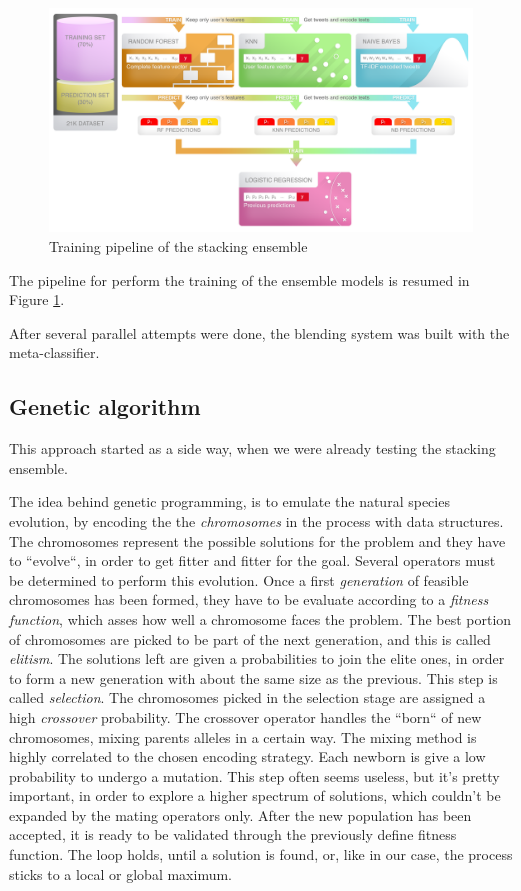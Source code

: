 \begin{figure}[htp!]
	\centering
	\includegraphics[width=\columnwidth]{chapter5/figure/stacking_train.png}
	\caption{Training pipeline of the stacking ensemble}
	\label{fig:stacking_pipeline}
\end{figure}
The pipeline for perform the training of the ensemble models is resumed in Figure \ref{fig:stacking_pipeline}.

After several parallel attempts were done, the blending system was built with the meta-classifier.

\subsection{Genetic algorithm}
This approach started as a side way, when we were already testing the stacking ensemble.

The idea behind genetic programming, is to emulate the natural species evolution, by encoding the the \textit{chromosomes} in the process with data structures.
The chromosomes represent the possible solutions for the problem and they have to ``evolve``, in order to get fitter and fitter for the goal.
Several operators must be determined to perform this evolution.
Once a first \textit{generation} of feasible chromosomes has been formed, they have to be evaluate according to a \textit{fitness function}, which asses how well a chromosome faces the problem.
The best portion of chromosomes are picked to be part of the next generation, and this is called \textit{elitism}. The solutions left are given a probabilities to join the elite ones, in order to form a new generation with about the same size as the previous. This step is called \textit{selection}.
The chromosomes picked in the selection stage are assigned a high \textit{crossover} probability.
The crossover operator handles the ``born`` of new chromosomes, mixing parents alleles in a certain way. The mixing method is highly correlated to the chosen encoding strategy.
Each newborn is give a low probability to undergo a mutation. This step often seems useless, but it's pretty important, in order to explore a higher spectrum of solutions, which couldn't be expanded by the mating operators only.
After the new population has been accepted, it is ready to be validated through the previously define fitness function.
The loop holds, until a solution is found, or, like in our case, the process sticks to a local or global maximum.

